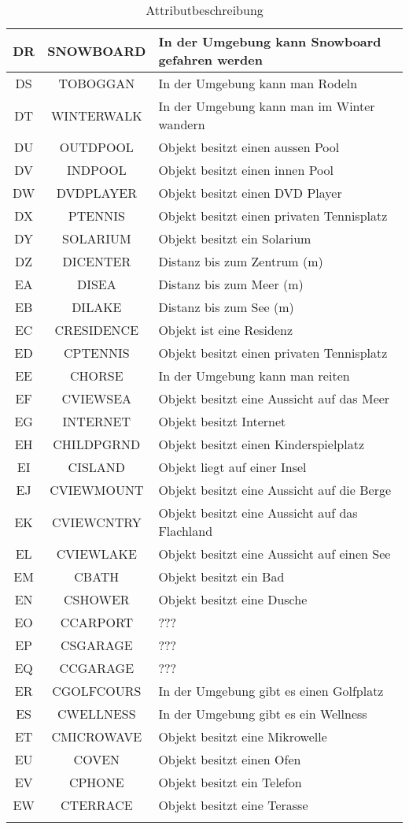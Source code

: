 \begin{longtable}{ | c | c | L{10cm} |}
	DR & SNOWBOARD & In der Umgebung kann Snowboard gefahren werden \\ \hline 
	DS & TOBOGGAN & In der Umgebung kann man Rodeln \\ \hline 
	DT & WINTERWALK & In der Umgebung kann man im Winter wandern \\ \hline 
	DU & OUTDPOOL & Objekt besitzt einen aussen Pool \\ \hline 
	DV & INDPOOL & Objekt besitzt einen innen Pool \\ \hline 
	DW & DVDPLAYER & Objekt besitzt einen DVD Player \\ \hline 
	DX & PTENNIS & Objekt besitzt einen privaten Tennisplatz \\ \hline 
	DY & SOLARIUM & Objekt besitzt ein Solarium \\ \hline 
	DZ & DICENTER & Distanz bis zum Zentrum (m) \\ \hline 
	EA & DISEA & Distanz bis zum Meer (m) \\ \hline 
	EB & DILAKE & Distanz bis zum See (m) \\ \hline 
	EC & CRESIDENCE & Objekt ist eine Residenz \\ \hline 
	ED & CPTENNIS & Objekt besitzt einen privaten Tennisplatz \\ \hline 
	EE & CHORSE & In der Umgebung kann man reiten \\ \hline 
	EF & CVIEWSEA & Objekt besitzt eine Aussicht auf das Meer \\ \hline 
	EG & INTERNET & Objekt besitzt Internet \\ \hline 
	EH & CHILDPGRND & Objekt besitzt einen Kinderspielplatz \\ \hline 
	EI & CISLAND & Objekt liegt auf einer Insel \\ \hline 
	EJ & CVIEWMOUNT & Objekt besitzt eine Aussicht auf die Berge \\ \hline 
	EK & CVIEWCNTRY & Objekt besitzt eine Aussicht auf das Flachland \\ \hline 
	EL & CVIEWLAKE & Objekt besitzt eine Aussicht auf einen See \\ \hline 
	EM & CBATH & Objekt besitzt ein Bad \\ \hline 
	EN & CSHOWER & Objekt besitzt eine Dusche \\ \hline 
	EO & CCARPORT & ??? \\ \hline 
	EP & CSGARAGE & ??? \\ \hline 
	EQ & CCGARAGE & ??? \\ \hline 
	ER & CGOLFCOURS & In der Umgebung gibt es einen Golfplatz \\ \hline 
	ES & CWELLNESS & In der Umgebung gibt es ein Wellness \\ \hline 
	ET & CMICROWAVE & Objekt besitzt eine Mikrowelle \\ \hline 
	EU & COVEN & Objekt besitzt einen Ofen \\ \hline 
	EV & CPHONE & Objekt besitzt ein Telefon \\ \hline 
	EW & CTERRACE & Objekt besitzt eine Terasse \\ \hline 
	\caption{Attributbeschreibung}
\end{longtable} 

											